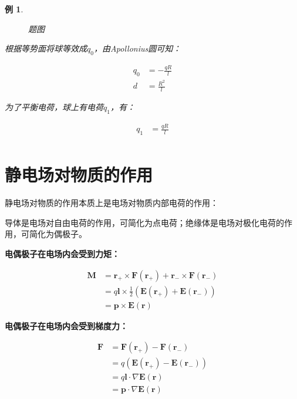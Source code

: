 \documentclass[12pt,onecolumn,a4paper]{book}
\newtheorem*{example}{例}
\numberwithin{table}{subsection}
\numberwithin{equation}{subsection}
\begin{document}
\begin{example}
\begin{figure}[ht]
\begin{tikzpicture}[x=0.75pt,y=0.75pt,yscale=-1,xscale=1]
        \end{tikzpicture}

        \caption{题图}
    \end{figure}

    根据等势面将球等效成$q_0$，由Apollonius圆可知：

    \begin{align}
        q_0 & = -\frac{qR}{l} \\
        d   & = \frac{R^2}{l}
    \end{align}

    为了平衡电荷，球上有电荷$q_1$，有：

    \begin{align}
        q_1 & = \frac{qR}{l} \\
    \end{align}
\end{example}

\section{静电场对物质的作用}

静电场对物质的作用本质上是电场对物质内部电荷的作用：

导体是电场对自由电荷的作用，可简化为点电荷；绝缘体是电场对极化电荷的作用，可简化为偶极子。

\textbf{电偶极子在电场内会受到力矩：}

\begin{align}
    \mathbf{M} & = \mathbf{r}_+ \times \mathbf{F}(\mathbf{r}_+) + \mathbf{r}_- \times \mathbf{F}(\mathbf{r}_-) \\
               & = q \mathbf{l} \times \frac{1}{2}(\mathbf{E}(\mathbf{r}_+)+\mathbf{E}(\mathbf{r}_-) )         \\
               & = \mathbf{p} \times \mathbf{E}(\mathbf{r})
\end{align}

\textbf{电偶极子在电场内会受到梯度力：}

\begin{align}
    \mathbf{F} & = \mathbf{F}(\mathbf{r}_+) - \mathbf{F}(\mathbf{r}_-)    \\
               & = q (\mathbf{E}(\mathbf{r}_+) -\mathbf{E}(\mathbf{r}_-)) \\
               & = q \mathbf{l} \cdot \nabla \mathbf{E}(\mathbf{r})       \\
               & = \mathbf{p} \cdot \nabla \mathbf{E}(\mathbf{r})
\end{align}
\end{document}
